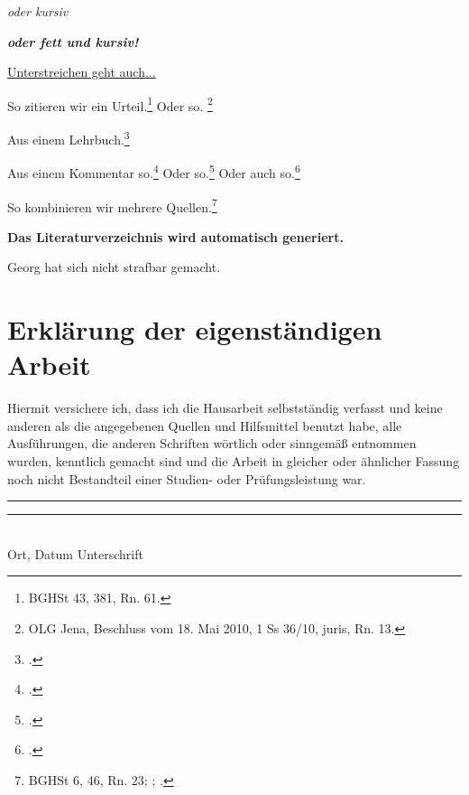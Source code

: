 \documentclass{jura}
\begin{document}
\textit{oder kursiv}

\textit{\textbf{oder fett und kursiv!}}

\underline{Unterstreichen geht auch...}

\levelup
{}

\levelup
{}

\levelup
\levelup
{}



So zitieren wir ein Urteil.\footnote{BGHSt 43, 381, Rn. 61.} Oder so. \footnote{OLG Jena, Beschluss vom 18. Mai 2010, 1 Ss 36/10, juris, Rn. 13.}

Aus einem Lehrbuch.\footcite[\S~14~Rn.~6]{rengier}

Aus einem Kommentar so.\footcite[Sternberg-Lieben/Schuster][\S~15~Rn.~68]{schoenkeschroeder} Oder so.\footcite[Freund][]{mueko} Oder auch so.\footcite[Bosch][]{schoenkeschroeder}

So kombinieren wir mehrere Quellen.\footnote{BGHSt 6, 46, Rn. 23; \cite[Heuchemer][\S~13~Rn.~91]{beckOKStGB}; \cite[236]{esser}.}

\textbf{Das Literaturverzeichnis wird automatisch generiert.}

\levelup
{}

Georg hat sich nicht strafbar gemacht.

\newpage

\section*{Erklärung der eigenständigen Arbeit}

Hiermit versichere ich, dass ich die Hausarbeit selbstständig verfasst und keine anderen als die angegebenen Quellen und Hilfsmittel benutzt habe, alle Ausführungen, die anderen Schriften wörtlich oder sinngemäß entnommen wurden, kenntlich gemacht sind und die Arbeit in gleicher oder ähnlicher Fassung noch nicht Bestandteil einer Studien- oder Prüfungsleistung war.

\vspace{1.5cm}
\rule{4cm}{0.1pt} \hfill \rule{7cm}{0.1pt} \\
\hspace*{0.2cm} Ort, Datum \hspace*{2.4cm} Unterschrift
\end{document}
